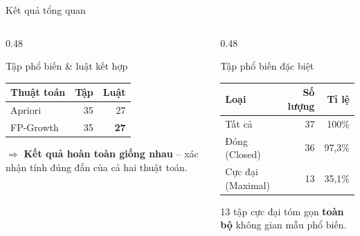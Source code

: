 \documentclass[aspectratio=169]{beamer}
\begin{document}
\begin{frame}{Kết quả tổng quan}
  \begin{columns}[T]
    \begin{column}{0.48\textwidth}
      \begin{block}{Tập phổ biến \& luật kết hợp}
        \centering
        \begin{tabular}{lrr}
          \toprule
          \textbf{Thuật toán} & \textbf{Tập} & \textbf{Luật} \\
          \midrule
          Apriori   & 35 & 27 \\
          FP-Growth & 35 & \textbf{27} \\
          \bottomrule
        \end{tabular}
        \vspace{0.3em}

        $\Rightarrow$ \textbf{Kết quả hoàn toàn giống nhau} -- xác nhận tính đúng đắn của cả hai thuật toán.
      \end{block}
    \end{column}
    \begin{column}{0.48\textwidth}
      \begin{block}{Tập phổ biến đặc biệt}
        \centering
        \begin{tabular}{lrr}
          \toprule
          \textbf{Loại} & \textbf{Số lượng} & \textbf{Tỉ lệ} \\
          \midrule
          Tất cả       & 37 & 100\% \\
          Đóng (Closed) & 36 & 97,3\% \\
          Cực đại (Maximal) & 13 & 35,1\% \\
          \bottomrule
        \end{tabular}
        \vspace{0.3em}

        13 tập cực đại tóm gọn \textbf{toàn bộ} không gian mẫu phổ biến.
      \end{block}
    \end{column}
  \end{columns}
\end{frame}
\end{document}

